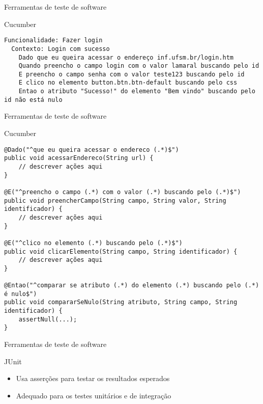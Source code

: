 \documentclass{beamer}
\begin{document}
\begin{frame}[fragile]{Ferramentas de teste de software}
    \item Cucumber
    \begin{lstlisting}
Funcionalidade: Fazer login
  Contexto: Login com sucesso
    Dado que eu queira acessar o endereço inf.ufsm.br/login.htm
    Quando preencho o campo login com o valor lamaral buscando pelo id
    E preencho o campo senha com o valor teste123 buscando pelo id
    E clico no elemento button.btn.btn-default buscando pelo css
    Entao o atributo "Sucesso!" do elemento "Bem vindo" buscando pelo id não está nulo
	\end{lstlisting}
\end{frame}
\begin{frame}[fragile]{Ferramentas de teste de software}
    \item Cucumber
    \begin{lstlisting}
@Dado("^que eu queira acessar o endereco (.*)$")
public void acessarEndereco(String url) {
    // descrever ações aqui
}

@E("^preencho o campo (.*) com o valor (.*) buscando pelo (.*)$")
public void preencherCampo(String campo, String valor, String identificador) {
    // descrever ações aqui
}

@E("^clico no elemento (.*) buscando pelo (.*)$")
public void clicarElemento(String campo, String identificador) {
    // descrever ações aqui
}

@Entao("^comparar se atributo (.*) do elemento (.*) buscando pelo (.*) é nulo$")
public void compararSeNulo(String atributo, String campo, String identificador) {
    assertNull(...);
}

	\end{lstlisting}
\end{frame}
\begin{frame}[fragile]{Ferramentas de teste de software}
    \item JUnit
	\begin{itemize}
		\item Usa asserções para testar os resultados esperados
        \item Adequado para os testes unitários e de integração
	\end{itemize}
\end{frame}
\end{document}

